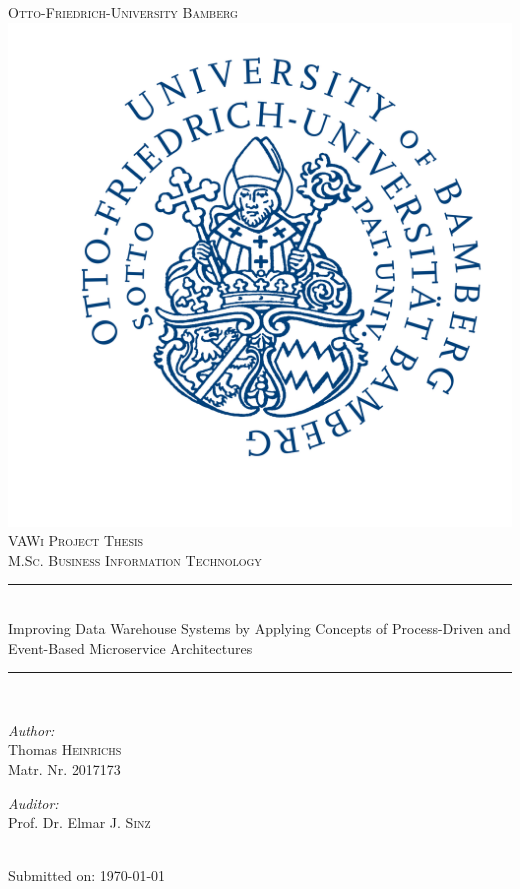 
\begin{titlepage}
\newcommand{\HRule}{\rule{\linewidth}{0.5mm}} 
\center
\textsc{\LARGE Otto-Friedrich-University Bamberg}\\[1.5cm] 
\includegraphics[scale=0.1]{Logos/Otto-Friedrich-Universitaet_Bamberg_logo.png}\\
\textsc{\Large VAWi Project Thesis}\\[0.8cm] 
\textsc{\large M.Sc. Business Information Technology}\\[0.5cm]
\HRule \\[0.4cm]
{\Large Improving Data Warehouse Systems by Applying Concepts of Process-Driven and Event-Based Microservice Architectures}
\HRule \\[1cm]
\begin{minipage}{0.4\textwidth}
\begin{flushleft} \large
\emph{Author:}\\
Thomas\textsc{ Heinrichs}\\
Matr. Nr. \textsc{2017173}
\end{flushleft}
\end{minipage}
\begin{minipage}{0.4\textwidth}
\begin{flushright} \large
\emph{Auditor:} \\
Prof. Dr. Elmar J. \textsc{Sinz}\\
\end{flushright}
\end{minipage}\\[2cm]
{Submitted on: \large \today}\\[1.4cm] 
\vfill
\end{titlepage}